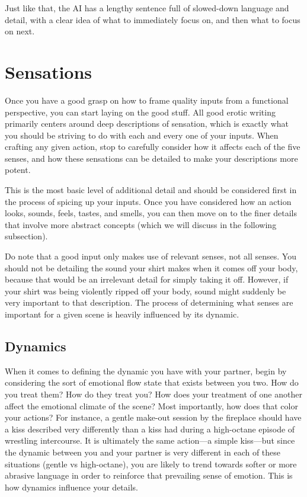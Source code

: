 ﻿\documentclass[Coomer-main.tex]{subfiles}
\begin{document}
Just like that, the AI has a lengthy sentence full of slowed-down language and detail, with a clear idea of what to immediately focus on, and then what to focus on next.

\section{Sensations}

Once you have a good grasp on how to frame quality inputs from a functional perspective, you can start laying on the good stuff. All good erotic writing primarily centers around deep descriptions of sensation, which is exactly what you should be striving to do with each and every one of your inputs. When crafting any given action, stop to carefully consider how it affects each of the five senses, and how these sensations can be detailed to make your descriptions more potent.

This is the most basic level of additional detail and should be considered first in the process of spicing up your inputs. Once you have considered how an action looks, sounds, feels, tastes, and smells, you can then move on to the finer details that involve more abstract concepts (which we will discuss in the following subsection).

Do note that a good input only makes use of relevant senses, not all senses. You should not be detailing the sound your shirt makes when it comes off your body, because that would be an irrelevant detail for simply taking it off. However, if your shirt was being violently ripped off your body, sound might suddenly be very important to that description. The process of determining what senses are important for a given scene is heavily influenced by its dynamic.

\subsection{Dynamics}

When it comes to defining the dynamic you have with your partner, begin by considering the sort of emotional flow state that exists between you two. How do you treat them? How do they treat you? How does your treatment of one another affect the emotional climate of the scene? Most importantly, how does that color your actions? For instance, a gentle make-out session by the fireplace should have a kiss described very differently than a kiss had during a high-octane episode of wrestling intercourse. It is ultimately the same action—a simple kiss—but since the dynamic between you and your partner is very different in each of these situations (gentle vs high-octane), you are likely to trend towards softer or more abrasive language in order to reinforce that prevailing sense of emotion. This is how dynamics influence your details.
\end{document}
